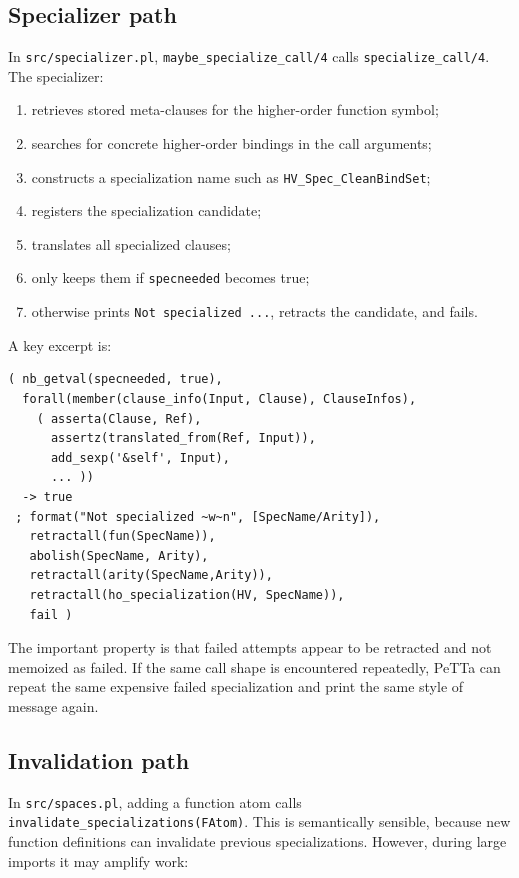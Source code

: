 \documentclass[11pt]{article}
\begin{document}
\subsection{Specializer path}

In \texttt{src/specializer.pl}, \texttt{maybe_specialize_call/4} calls \texttt{specialize_call/4}. The specializer:

\begin{enumerate}[nosep]
\item retrieves stored meta-clauses for the higher-order function symbol;
\item searches for concrete higher-order bindings in the call arguments;
\item constructs a specialization name such as \texttt{HV\_Spec\_CleanBindSet};
\item registers the specialization candidate;
\item translates all specialized clauses;
\item only keeps them if \texttt{specneeded} becomes true;
\item otherwise prints \texttt{Not specialized ...}, retracts the candidate, and fails.
\end{enumerate}

A key excerpt is:

\begin{lstlisting}
( nb_getval(specneeded, true),
  forall(member(clause_info(Input, Clause), ClauseInfos),
    ( asserta(Clause, Ref),
      assertz(translated_from(Ref, Input)),
      add_sexp('&self', Input),
      ... ))
  -> true
 ; format("Not specialized ~w~n", [SpecName/Arity]),
   retractall(fun(SpecName)),
   abolish(SpecName, Arity),
   retractall(arity(SpecName,Arity)),
   retractall(ho_specialization(HV, SpecName)),
   fail )
\end{lstlisting}

The important property is that failed attempts appear to be retracted and not memoized as failed. If the same call shape is encountered repeatedly, PeTTa can repeat the same expensive failed specialization and print the same style of message again.

\subsection{Invalidation path}

In \texttt{src/spaces.pl}, adding a function atom calls \texttt{invalidate_specializations(FAtom)}. This is semantically sensible, because new function definitions can invalidate previous specializations. However, during large imports it may amplify work:
\end{document}
